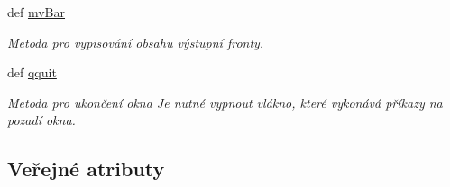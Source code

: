\begin{DoxyCompactItemize}
def \hyperlink{classmnClean_1_1App_a7e0a0a24e1044ddb6749a380e109f84a}{mv\-Bar}
\begin{DoxyCompactList}\small\item\em Metoda pro vypisování obsahu výstupní fronty. \end{DoxyCompactList}\item 
def \hyperlink{classmnClean_1_1App_a1d63ab1d7fe79b555e86748976675a42}{qquit}
\begin{DoxyCompactList}\small\item\em Metoda pro ukončení okna Je nutné vypnout vlákno, které vykonává příkazy na pozadí okna. \end{DoxyCompactList}\end{DoxyCompactItemize}
\subsection*{Veřejné atributy}
